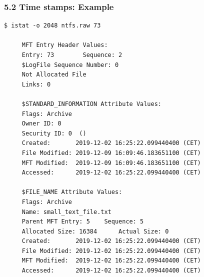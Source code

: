 \begin{frame}[fragile]
\frametitle{5.2 Time stamps: Example}
  \begin{lstlisting}[basicstyle=\tiny]
$ istat -o 2048 ntfs.raw 73

     MFT Entry Header Values:
     Entry: 73        Sequence: 2
     $LogFile Sequence Number: 0
     Not Allocated File
     Links: 0

     $STANDARD_INFORMATION Attribute Values:
     Flags: Archive
     Owner ID: 0
     Security ID: 0  ()
     Created:   	2019-12-02 16:25:22.099440400 (CET)
     File Modified:	2019-12-09 16:09:46.183651100 (CET)
     MFT Modified:	2019-12-09 16:09:46.183651100 (CET)
     Accessed:  	2019-12-02 16:25:22.099440400 (CET)

     $FILE_NAME Attribute Values:
     Flags: Archive
     Name: small_text_file.txt
     Parent MFT Entry: 5 	Sequence: 5
     Allocated Size: 16384   	Actual Size: 0
     Created:   	2019-12-02 16:25:22.099440400 (CET)
     File Modified:	2019-12-02 16:25:22.099440400 (CET)
     MFT Modified:	2019-12-02 16:25:22.099440400 (CET)
     Accessed:  	2019-12-02 16:25:22.099440400 (CET)
  \end{lstlisting}
\end{frame}


